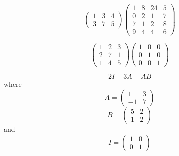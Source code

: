 \begin{equation}
    \begin{pmatrix}
        1       &       3       &       4   \\
        3       &       7       &       5
    \end{pmatrix}
    \begin{pmatrix}
        1       &       8       &       24      &   5   \\
        0       &       2       &       1       &   7   \\
        7       &       1       &       2       &   8   \\
        9       &       4       &       4       &   6
    \end{pmatrix}
\end{equation}

\begin{equation}
    \begin{pmatrix}
        1       &       2       &       3   \\
        2       &       7       &       1   \\
        1       &       4       &       5   
    \end{pmatrix}
    \begin{pmatrix}
        1       &       0       &       0   \\
        0       &       1       &       0   \\
        0       &       0       &       1
    \end{pmatrix}
\end{equation}

\begin{equation}
    2I + 3A -AB
\end{equation}
where
\begin{equation}
    A =
    \begin{pmatrix}
        1       &       3       \\
        -1      &       7       
    \end{pmatrix}
\end{equation}
\begin{equation}
    B =
    \begin{pmatrix}
        5       &       2       \\
        1       &       2       
    \end{pmatrix}
\end{equation}
and
\begin{equation}
    I = 
    \begin{pmatrix}
        1       &       0       \\
        0       &       1   
    \end{pmatrix}
\end{equation}
